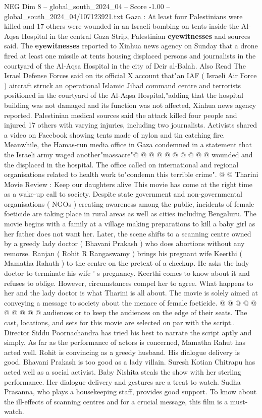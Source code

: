 \begin{textsample}{NEG Dim 8 – global\_south\_2024\_04 – Score -1.00 – global\_south\_2024\_04/107123921.txt}  \label{ex:f8_neg_261}
Gaza : At least four Palestinians were killed and 17 others were wounded in an Israeli bombing on tents inside the Al-Aqsa Hospital in the central Gaza Strip, Palestinian \textbf{eyewitnesses} and sources said.
The \textbf{eyewitnesses} reported to Xinhua news agency on Sunday that a drone fired at least one missile at tents housing displaced persons and journalists in the courtyard of the Al-Aqsa Hospital in the city of Deir al-Balah.
Also Read The Israel Defense Forces said on its official X account that"an IAF ( Israeli Air Force ) aircraft struck an operational Islamic Jihad command centre and terrorists positioned in the courtyard of the Al-Aqsa Hospital,"adding that the hospital building was not damaged and its function was not affected, Xinhua news agency reported.
Palestinian medical sources said the attack killed four people and injured 17 others with varying injuries, including two journalists.
Activists shared a video on Facebook showing tents made of nylon and tin catching fire.
Meanwhile, the Hamas-run media office in Gaza condemned in a statement that the Israeli army waged another"massacre"@ @ @ @ @ @ @ @ @ @ wounded and the displaced in the hospital.
The office called on international and regional organisations related to health work to"condemn this terrible crime". @ @ Tharini Movie Review : Keep our daughters alive This movie has come at the right time as a wake-up call to society.
Despite state government and non-governmental organisations ( NGOs ) creating awareness among the public, incidents of female foeticide are taking place in rural areas as well as cities including Bengaluru.
The movie begins with a family at a village making preparations to kill a baby girl as her father does not want her.
Later, the scene shifts to a scanning centre owned by a greedy lady doctor ( Bhavani Prakash ) who does abortions without any remorse.
Ranjan ( Rohit R Rangaswamy ) brings his pregnant wife Keerthi ( Mamatha Rahuth ) to the centre on the pretext of a checkup.
He asks the lady doctor to terminate his wife ' s pregnancy.
Keerthi comes to know about it and refuses to oblige.
However, circumstances compel her to agree.
What happens to her and the lady doctor is what Tharini is all about.
The movie is solely aimed at conveying a message to society about the menace of female foeticide. @ @ @ @ @ @ @ @ @ @ audiences or to keep the audiences on the edge of their seats.
The cast, locations, and sets for this movie are selected on par with the script..
Director Siddu Poornachandra has tried his best to narrate the script aptly and simply.
As far as the performance of actors is concerned, Mamatha Rahut has acted well.
Rohit is convincing as a greedy husband.
His dialogue delivery is good.
Bhavani Prakash is too good as a lady villain.
Suresh Kotian Chitrapu has acted well as a social activist.
Baby Nishita steals the show with her sterling performance.
Her dialogue delivery and gestures are a treat to watch.
Sudha Prasanna, who plays a housekeeping staff, provides good support.
To know about the ill-effects of scanning centres and for a crucial message, this film is a must-watch.

\end{textsample}
